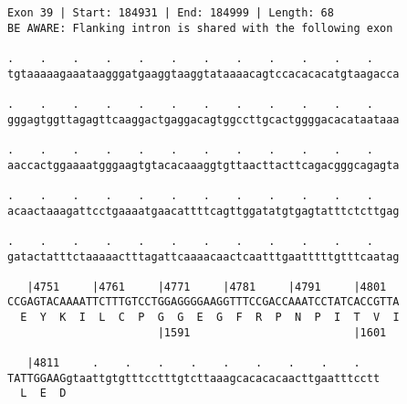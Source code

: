 \documentclass{article}
\begin{document}
\newpage
\begin{Verbatim}[fontfamily=courier]
Exon 39 | Start: 184931 | End: 184999 | Length: 68
BE AWARE: Flanking intron is shared with the following exon

.    .    .    .    .    .    .    .    .    .    .    .    
tgtaaaaagaaataagggatgaaggtaaggtataaaacagtccacacacatgtaagacca

.    .    .    .    .    .    .    .    .    .    .    .    
gggagtggttagagttcaaggactgaggacagtggccttgcactggggacacataataaa

.    .    .    .    .    .    .    .    .    .    .    .    
aaccactggaaaatgggaagtgtacacaaaggtgttaacttacttcagacgggcagagta

.    .    .    .    .    .    .    .    .    .    .    .    
acaactaaagattcctgaaaatgaacattttcagttggatatgtgagtatttctcttgag

.    .    .    .    .    .    .    .    .    .    .    .    
gatactatttctaaaaactttagattcaaaacaactcaatttgaatttttgtttcaatag

   |4751     |4761     |4771     |4781     |4791     |4801  
CCGAGTACAAAATTCTTTGTCCTGGAGGGGAAGGTTTCCGACCAAATCCTATCACCGTTA
  E  Y  K  I  L  C  P  G  G  E  G  F  R  P  N  P  I  T  V  I
                       |1591                         |1601  

   |4811     .    .    .    .    .    .    .    .    .   
TATTGGAAGgtaattgtgtttcctttgtcttaaagcacacacaacttgaatttcctt
  L  E  D                                                
\end{Verbatim}
\newpage
\end{document}
